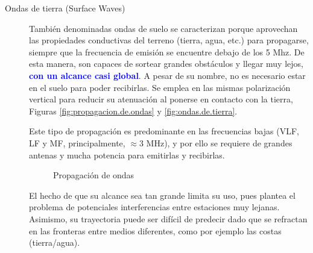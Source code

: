 \begin{description}
  \item[Ondas de tierra (Surface Waves)] Tambi\'en denominadas ondas de suelo se caracterizan porque aprovechan las propiedades conductivas del terreno (tierra, agua, etc.) para propagarse, siempre que la frecuencia de emisi\'on se encuentre debajo de los 5 Mhz. De esta manera, son capaces de sortear grandes obst\'aculos y llegar muy lejos, \textcolor{blue}{\bf con un alcance casi global}. A pesar de su nombre, no es necesario estar en el suelo para poder recibirlas.
Se emplea en las mismas polarizaci\'on vertical para reducir su atenuaci\'on al ponerse en contacto con la tierra, Figuras \ref{fig:propagacion.de.ondas} y \ref{fig:ondas.de.tierra}.

Este tipo de propagaci\'on es predominante en las frecuencias bajas (VLF, LF y MF, principalmente, $\approx 3$ MHz), y por ello se requiere de grandes antenas y mucha potencia para emitirlas y recibirlas.

\begin{figure}[!h]
  \centering
  \caption{Propagaci\'on de ondas}
\end{figure}

El hecho de que su alcance sea tan grande limita su uso, pues plantea el problema de potenciales interferencias entre estaciones muy lejanas. Asimismo, su trayectoria puede ser dif\'icil de predecir dado que se refractan en las fronteras entre medios diferentes, como por ejemplo las costas (tierra/agua). 


\end{description}
